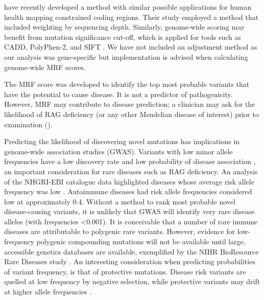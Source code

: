 \documentclass[preprint,11pt,fleqn]{elsarticle}
\begin{document}
\citet{Havrilla220814} have recently developed a method with similar possible applications for human health mapping constrained coding regions.  
Their study employed a method that included weighting by sequencing depth. 
Similarly, genome-wide scoring may benefit from mutation significance cut-off, which is applied for tools such as CADD, PolyPhen-2, and SIFT 
\citep{itan2016mutation}.
We have not included an adjustment method as our analysis was gene-specific but implementation is advised when calculating genome-wide MRF scores. 

The MRF score was developed to identify the top most probable variants that have the potential to cause disease. 
It is not a predictor of pathogenicity. However, MRF may contribute to disease prediction; a clinician may ask for the likelihood of RAG deficiency (or any other Mendelian disease of interest) prior to examination 
(\textbf{}).

Predicting the likelihood of discovering novel mutations has implications in genome-wide association studies (GWAS). 
Variants with low minor allele frequencies have a low discovery rate and low probability of disease association \citep{kido2018minor}, an important consideration for rare diseases such as RAG deficiency.
An analysis of the NHGRI-EBI catalogue data highlighted diseases whose average risk allele frequency was low
\citep{kido2018minor}.
Autoimmune diseases had risk allele frequencies considered low at approximately 0.4. 
Without a method to rank most probable novel disease-causing variants, it is unlikely that GWAS will identify very rare disease alleles (with frequencies <0.001). 
It is conceivable that a number of rare immune diseases are attributable to polygenic rare variants. 
However, evidence for low-frequency polygenic compounding mutations will not be available until large, accessible genetics databases are available, exemplified by the NIHR BioResource Rare Diseases study 
\citep{lawless2018prevalence}. 
An interesting consideration when predicting probabilities of variant frequency, is that of protective mutations. 
Disease risk variants are quelled at low frequency by negative selection, while protective variants may drift at higher allele frequencies 
\citep{chan2014excess}.
\end{document}
